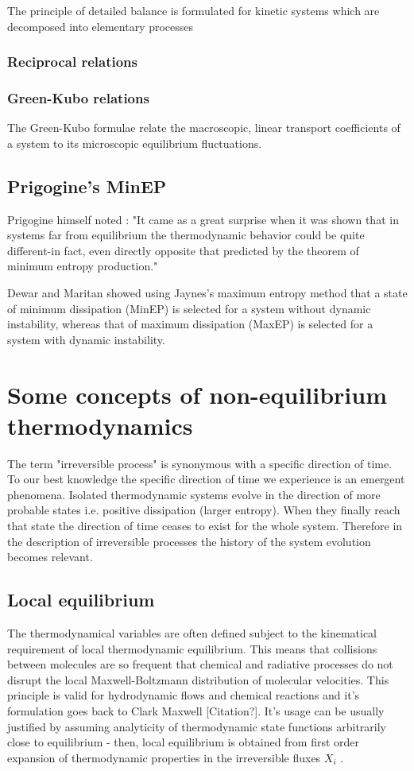 \documentclass[a4paper,12pt,nofootinbib]{article}
\begin{document}
The principle of detailed balance is formulated for kinetic systems which are decomposed into elementary processes
\subsubsection{Reciprocal relations}

\subsubsection{Green-Kubo relations}

The Green-Kubo formulae relate the macroscopic, linear transport coefficients of a system to its microscopic equilibrium fluctuations.


\subsection{Prigogine's MinEP}
Prigogine himself noted \cite{Prigogine:1979ul}:
"It came as a great surprise when it was shown that in systems far from equilibrium the thermodynamic behavior could be quite different-in fact, even directly opposite that predicted by the theorem of minimum entropy production."

Dewar and Maritan \cite{Dewar:2014ek} showed using Jaynes's maximum entropy method that a state of minimum dissipation (MinEP) is selected for a system without dynamic instability, whereas that of maximum dissipation (MaxEP) is selected for a system with dynamic instability.

\newpage

\section{Some concepts of non-equilibrium thermodynamics}
The term "irreversible process" is synonymous with a specific direction of time.
To our best knowledge the specific direction of time we experience is an emergent phenomena.
Isolated thermodynamic systems evolve in the direction of more probable states i.e. positive dissipation (larger entropy).
When they finally reach that state the direction of time ceases to exist for the whole system. 
Therefore in the description of irreversible processes the history of the system evolution becomes relevant.


\subsection{Local equilibrium}
The thermodynamical variables are often defined subject to the kinematical requirement of local thermodynamic equilibrium. This means that collisions between molecules are so frequent that chemical and radiative processes do not disrupt the local Maxwell-Boltzmann distribution of molecular velocities. This principle is valid for hydrodynamic flows and chemical reactions and it's formulation goes back to Clark Maxwell [Citation?].
It's usage can be usually justified by assuming analyticity of thermodynamic state functions arbitrarily close to equilibrium - then, local equilibrium is obtained from first order expansion of thermodynamic properties in the irreversible fluxes ${X_i}$ \cite{Evans:2002gg}.
\end{document}
